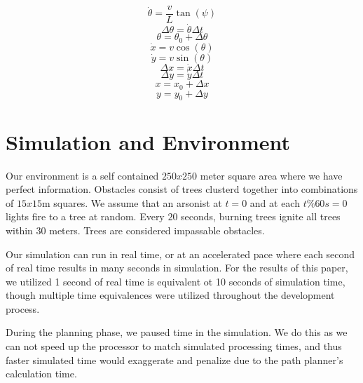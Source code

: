 \documentclass{article}
\begin{document}
\begin{equation}
    \dot{\theta} = \frac{v}{L} \tan(\psi)
\end{equation}
\begin{equation}
    \Delta \theta = \dot{\theta} \Delta t
\end{equation}
\begin{equation}
    \theta = \theta_0 + \Delta \theta
\end{equation}
\begin{equation}
    \dot{x} = v \cos(\theta)
\end{equation}
\begin{equation}
    \dot{y} = v \sin(\theta)
\end{equation}
\begin{equation}
    \Delta x = \dot{x} \Delta t
\end{equation}
\begin{equation}
    \Delta y = \dot{y} \Delta t
\end{equation}
\begin{equation}
    x = x_0 + \Delta x
\end{equation}
\begin{equation}
    y = y_0 + \Delta y
\end{equation}

\section*{Simulation and Environment}

Our environment is a self contained $250x250$ meter square area where we have perfect information. Obstacles consist of trees clusterd together into combinations of $15x15$m squares. We assume that an arsonist at $t=0$ and at each $t\%60s=0$ lights fire to a tree at random. Every $20$ seconds, burning trees ignite all trees within $30$ meters. Trees are considered impassable obstacles.

Our simulation can run in real time, or at an accelerated pace where each second of real time results in many seconds in simulation. For the results of this paper, we utilized 1 second of real time is equivalent ot 10 seconds of simulation time, though multiple time equivalences were utilized throughout the development process.

During the planning phase, we paused time in the simulation. We do this as we can not speed up the processor to match simulated processing times, and thus faster simulated time would exaggerate and penalize due to the path planner's calculation time.
\end{document}
